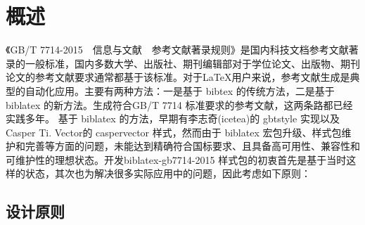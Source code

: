 \documentclass[11pt]{article} %
\begin{document}
\newpage
{}
\pagestyle{fancy}
\section{概述}

《GB/T 7714-2015~~信息与文献~~参考文献著录规则》是国内科技文档参考文献著录的一般标准，国内多数大学、出版社、期刊编辑部对于学位论文、出版物、期刊论文的参考文献要求通常都基于该标准。对于\LaTeX{}用户来说，参考文献生成是典型的自动化应用。主要有两种方法：一是基于 bibtex 的传统方法，二是基于 biblatex 的新方法。生成符合GB/T 7714 标准要求的参考文献，这两条路都已经实践多年。
基于 biblatex 的方法，早期有李志奇(icetea)的 gbtstyle 实现以及Casper Ti. Vector的 caspervector 样式，然而由于 biblatex 宏包升级、样式包维护和完善等方面的问题，未能达到精确符合国标要求、且具备高可用性、兼容性和可维护性的理想状态。开发biblatex-gb7714-2015 样式包的初衷首先是基于当时这样的状态，其次也为解决很多实际应用中的问题，因此考虑如下原则：

\subsection{设计原则}
\end{document}
